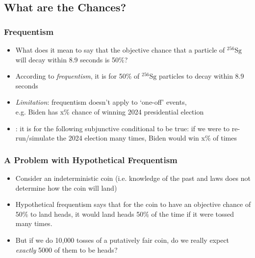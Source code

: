 \subsection{What are the Chances?}

\begin{frame}
\frametitle{Frequentism}

\begin{itemize}[<+->]

\item What does it mean to say that the objective chance that a particle of $^{256}\mbox{Sg}$ will decay within 8.9 seconds is 50\%? 

\item According to \emph{frequentism}, it is for 50\% of $^{256}\mbox{Sg}$ particles to decay within 8.9 seconds

\item[] \textit{Limitation}: frequentism doesn't apply to `one-off' events, \\ e.g. Biden has x\% chance of winning 2024 presidential election  

\item {}: it is for the following subjunctive conditional to be true: if we were to re-run/simulate the 2024 election many times, Biden would win x\% of times


\end{itemize}
\end{frame}

\begin{frame}
\frametitle{A Problem with Hypothetical Frequentism}

\begin{itemize}[<+->]

\item Consider an indeterministic coin (i.e. knowledge of the past and laws does not determine how the coin will land)

\item Hypothetical frequentism says that for the coin to have an objective chance of 50\% to land heads, it would land heads 50\% of the time if it were tossed many times. 

\item But if we do 10,000 tosses of a putatively fair coin, do we really expect \textit{exactly} 5000 of them to be heads?


\end{itemize}
\end{frame}

